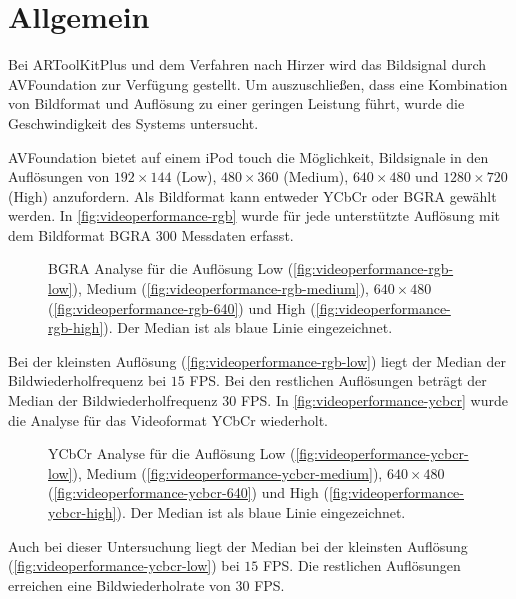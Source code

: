 \section{Allgemein} %
\label{sec:allgemein}

Bei ARToolKitPlus und dem Verfahren nach Hirzer wird das Bildsignal durch AVFoundation zur Verfügung gestellt. Um
 auszuschließen, dass eine Kombination von Bildformat und Auflösung zu einer geringen Leistung führt, wurde die
 Geschwindigkeit des Systems untersucht.

AVFoundation bietet auf einem iPod touch die Möglichkeit, Bildsignale in den Auflösungen von $192 \times 144$ (Low),
 $480 \times 360$ (Medium), $640 \times 480$ und $1280 \times 720$ (High) anzufordern. Als Bildformat kann entweder
 YCbCr oder BGRA gewählt werden. In \autoref{fig:videoperformance-rgb} wurde für jede unterstützte
 Auflösung mit dem Bildformat BGRA $300$ Messdaten erfasst.
\begin{figure}[!ht]
	\centering
	\caption{BGRA Analyse für die Auflösung Low (\autoref{fig:videoperformance-rgb-low}),
	 Medium (\autoref{fig:videoperformance-rgb-medium}), $640 \times 480$ (\autoref{fig:videoperformance-rgb-640}) und
	 High (\autoref{fig:videoperformance-rgb-high}). Der Median ist als blaue Linie eingezeichnet.}
	\label{fig:videoperformance-rgb}
\end{figure}
Bei der kleinsten Auflösung (\autoref{fig:videoperformance-rgb-low}) liegt der Median der Bildwiederholfrequenz bei $15$
 FPS. Bei den restlichen Auflösungen beträgt der Median der Bildwiederholfrequenz $30$ FPS. In
 \autoref{fig:videoperformance-ycbcr} wurde die Analyse für das Videoformat YCbCr wiederholt.
\begin{figure}[!hm]
	\centering
	\caption{YCbCr Analyse für die Auflösung Low (\autoref{fig:videoperformance-ycbcr-low}),
	 Medium (\autoref{fig:videoperformance-ycbcr-medium}), $640 \times 480$ (\autoref{fig:videoperformance-ycbcr-640})
	 und High (\autoref{fig:videoperformance-ycbcr-high}). Der Median ist als blaue Linie eingezeichnet.}
	\label{fig:videoperformance-ycbcr}
\end{figure}
Auch bei dieser Untersuchung liegt der Median bei der kleinsten Auflösung (\autoref{fig:videoperformance-ycbcr-low})
 bei $15$ FPS. Die restlichen Auflösungen erreichen eine Bildwiederholrate von $30$ FPS.

